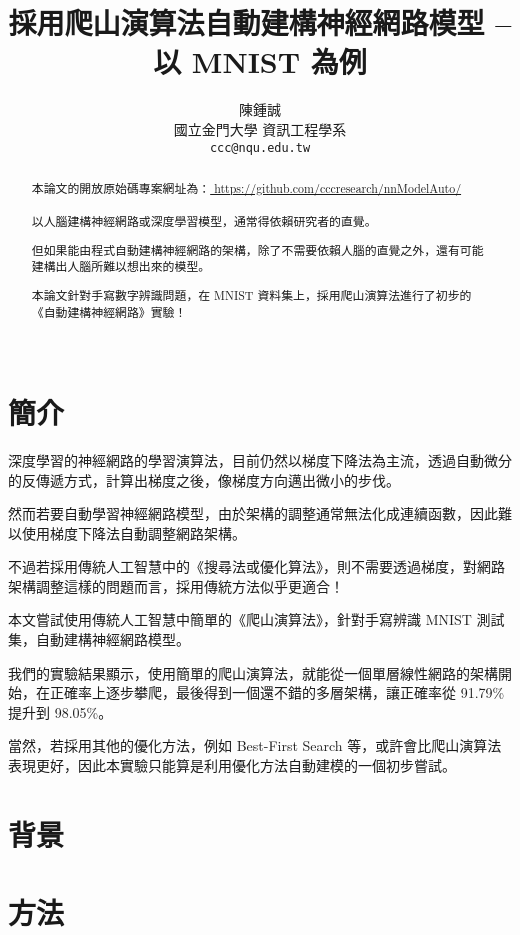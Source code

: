 \documentclass{article}
\title{採用爬山演算法自動建構神經網路模型 -- 以 MNIST 為例}
\author{
    陳鍾誠 \\
    國立金門大學 資訊工程學系\\
    \texttt{ccc@nqu.edu.tw} \\
}
\begin{document}
\maketitle

\begin{abstract}
本論文的開放原始碼專案網址為：\url{ https://github.com/cccresearch/nnModelAuto/ }
\\
\\
以人腦建構神經網路或深度學習模型，通常得依賴研究者的直覺。

但如果能由程式自動建構神經網路的架構，除了不需要依賴人腦的直覺之外，還有可能建構出人腦所難以想出來的模型。

本論文針對手寫數字辨識問題，在 MNIST 資料集上，採用爬山演算法進行了初步的《自動建構神經網路》實驗！\\
\\
\end{abstract}




\section{簡介}

深度學習的神經網路的學習演算法，目前仍然以梯度下降法為主流，透過自動微分的反傳遞方式，計算出梯度之後，像梯度方向邁出微小的步伐。

然而若要自動學習神經網路模型，由於架構的調整通常無法化成連續函數，因此難以使用梯度下降法自動調整網路架構。

不過若採用傳統人工智慧中的《搜尋法或優化算法》，則不需要透過梯度，對網路架構調整這樣的問題而言，採用傳統方法似乎更適合！

本文嘗試使用傳統人工智慧中簡單的《爬山演算法》，針對手寫辨識 MNIST 測試集，自動建構神經網路模型。

我們的實驗結果顯示，使用簡單的爬山演算法，就能從一個單層線性網路的架構開始，在正確率上逐步攀爬，最後得到一個還不錯的多層架構，讓正確率從 91.79\% 提升到 98.05\%。

當然，若採用其他的優化方法，例如 Best-First Search 等，或許會比爬山演算法表現更好，因此本實驗只能算是利用優化方法自動建模的一個初步嘗試。

\section{背景}


\section{方法}
\end{document}

